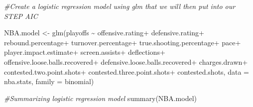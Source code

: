 \documentclass[
]{article}
\newenvironment{Shaded}{\begin{snugshade}}{\end{snugshade}}
\newcommand{\AttributeTok}[1]{\textcolor[rgb]{0.77,0.63,0.00}{#1}}
\newcommand{\CommentTok}[1]{\textcolor[rgb]{0.56,0.35,0.01}{\textit{#1}}}
\newcommand{\FunctionTok}[1]{\textcolor[rgb]{0.00,0.00,0.00}{#1}}
\newcommand{\NormalTok}[1]{#1}
\newcommand{\OtherTok}[1]{\textcolor[rgb]{0.56,0.35,0.01}{#1}}
\newcommand{\SpecialCharTok}[1]{\textcolor[rgb]{0.00,0.00,0.00}{#1}}
\begin{document}
\begin{Shaded}
\begin{Highlighting}[]
\CommentTok{\#Create a logistic regression model using glm that we will then put into our STEP AIC}

\NormalTok{NBA.model }\OtherTok{\textless{}{-}} \FunctionTok{glm}\NormalTok{(playoffs }\SpecialCharTok{\textasciitilde{}}\NormalTok{ offensive.rating}\SpecialCharTok{+}\NormalTok{ defensive.rating}\SpecialCharTok{+}\NormalTok{ rebound.percentage}\SpecialCharTok{+}\NormalTok{ turnover.percentage}\SpecialCharTok{+}\NormalTok{ true.shooting.percentage}\SpecialCharTok{+}\NormalTok{ pace}\SpecialCharTok{+}\NormalTok{ player.impact.estimate}\SpecialCharTok{+}\NormalTok{ screen.assists}\SpecialCharTok{+}\NormalTok{ deflections}\SpecialCharTok{+}\NormalTok{ offensive.loose.balls.recovered}\SpecialCharTok{+}\NormalTok{ defensive.loose.balls.recovered}\SpecialCharTok{+}\NormalTok{ charges.drawn}\SpecialCharTok{+}\NormalTok{ contested.two.point.shots}\SpecialCharTok{+}\NormalTok{ contested.three.point.shots}\SpecialCharTok{+}\NormalTok{ contested.shots, }\AttributeTok{data =}\NormalTok{ nba.stats, }\AttributeTok{family =}\NormalTok{ binomial)}
\end{Highlighting}
\end{Shaded}

\begin{Shaded}
\begin{Highlighting}[]
\CommentTok{\#Summarizing logistic regression model}
\FunctionTok{summary}\NormalTok{(NBA.model)}
\end{Highlighting}
\end{Shaded}
\end{document}
